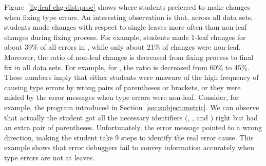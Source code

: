 \documentclass[12pt]{report}	%
\begin{document}
%
%
Figure~\ref{fig:leaf-chg-dist:proc} shows where students preferred
to make changes when fixing type errors. An interesting observation
is that, across all data sets, students made changes with respect to single leaves  
more often than non-leaf changes during fixing process. 
For example,
students made 1-leaf changes for about 39\% of all errors in \benchs,
while only about 21\% of changes were non-leaf.
Moreover,
the ratio of non-leaf changes is decreased from fixing
process to final fix in all data sets. For example, for \benchs,
the ratio is decreased from 60\% to 45\%.
%
These numbers imply that
either students were unaware of the high frequency of causing type
errors by wrong pairs of parentheses or brackets,
or they were misled by the error messages when type errors were non-leaf.
%
Consider, for example, the program  introduced in Section~\ref{sec:subject:metric}.
We can observe that actually the student got all the necessary identifiers (,
, and ) right but had an extra pair of
parentheses.
Unfortunately, the error message pointed to a wrong direction,
making the student take 9 steps to identify the real error cause.
This example shows that error debuggers fail to
convey information accurately
when type errors are not at leaves.
\end{document}
